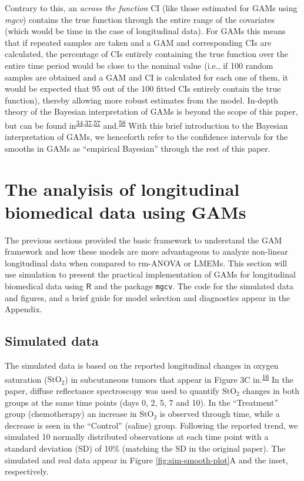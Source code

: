 \documentclass[
]{article}
\newcommand{\passthrough}[1]{#1}
\begin{document}
Contrary to this, an \emph{across the function} CI (like those estimated for GAMs using \emph{mgcv}) contains the true function through the entire range of the covariates (which would be time in the case of longitudinal data). For GAMs this means that if repeated samples are taken and a GAM and corresponding CIs are calculated, the percentage of CIs entirely containing the true function over the entire time period would be close to the nominal value (i.e., if 100 random samples are obtained and a GAM and CI is calculated for each one of them, it would be expected that 95 out of the 100 fitted CIs entirely contain the true function), thereby allowing more robust estimates from the model. In-depth theory of the Bayesian interpretation of GAMs is beyond the scope of this paper, but can be found in\textsuperscript{\protect\hyperlink{ref-simpson2018}{34},\protect\hyperlink{ref-wood2017}{37},\protect\hyperlink{ref-miller2019}{57}} and.\textsuperscript{\protect\hyperlink{ref-marra2012}{58}} With this brief introduction to the Bayesian interpretation of GAMs, we henceforth refer to the confidence intervals for the smooths in GAMs as ``empirical Bayesian'' through the rest of this paper.

\hypertarget{longitudinal-GAMs}{%
\section{The analyisis of longitudinal biomedical data using GAMs}\label{longitudinal-GAMs}}

The previous sections provided the basic framework to understand the GAM framework and how these models are more advantageous to analyze non-linear longitudinal data when compared to rm-ANOVA or LMEMs. This section will use simulation to present the practical implementation of GAMs for longitudinal biomedical data using \(\textsf{R}\) and the package \passthrough{\lstinline!mgcv!}. The code for the simulated data and figures, and a brief guide for model selection and diagnostics appear in the Appendix.

\hypertarget{simulated-data}{%
\subsection{Simulated data}\label{simulated-data}}

The simulated data is based on the reported longitudinal changes in oxygen saturation (\(\mbox{StO}_2\)) in subcutaneous tumors that appear in Figure 3C in.\textsuperscript{\protect\hyperlink{ref-vishwanath2009}{16}} In the paper, diffuse reflectance spectroscopy was used to quantify \(\mbox{StO}_2\) changes in both groups at the same time points (days 0, 2, 5, 7 and 10). In the ``Treatment'' group (chemotherapy) an increase in \(\mbox{StO}_2\) is observed through time, while a decrease is seen in the ``Control'' (saline) group. Following the reported trend, we simulated 10 normally distributed observations at each time point with a standard deviation (SD) of 10\% (matching the SD in the original paper).
The simulated and real data appear in Figure \ref{fig:sim-smooth-plot}A and the inset, respectively.
\end{document}
